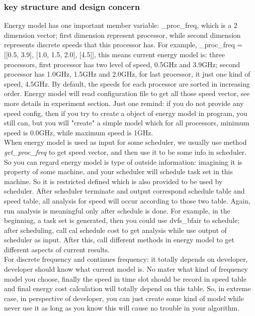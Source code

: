 \documentclass[11pt, oneside]{article}
\begin{document}
\subsubsection{key structure and design concern}
Energy model has one important member variable: \_proc\_freq, which is a 2 dimension vector; first dimension represent processor, while second dimension represents discrete speeds that this processor has. For example, \_proc\_freq = [[0.5, 3.9], [1.0, 1.5, 2.0], [4.5]], this means current energy model is: three processors, first processor has two level of speed, 0.5GHz and 3.9GHz; second processor has 1.0GHz, 1.5GHz and 2.0GHz, for last processor, it just one kind of speed, 4.5GHz. By default, the speeds for each processor are sorted in increasing order. Energy model will read configuration file to get all those speed vector, see more details in experiment section. Just one remind: if you do not provide any speed config, then if you try to create a object of energy model in program, you still can, but you will "create" a simple model which for all processors, minimum speed is 0.0GHz, while maximum speed is 1GHz.\\

When energy model is used as input for some scheduler, we usually use method \textit{get\_proc\_freq} to get speed vector, and then use it to be some info in scheduler. So you can regard energy model is type of outside information: imagining it is property of some machine, and  your scheduler will schedule task set in this machine. So it is restricted defined which is also provided to be used by scheduler. After scheduler terminate and output correspond schedule table and speed table, all analysis for speed will occur according to those two table. Again, run analysis is meaningful only after schedule is done. For example, in the beginning, a task set is generated, then you could use dvfs\_bfair to schedule; after scheduling, call cal schedule cost to get analysis while use output of scheduler as input. After this, call different methods in energy model to get different aspects of current results.\\

For discrete frequency and continues frequency: it totally depends on developer, developer should know what current model is. No mater what kind of frequency model you choose, finally the speed in time slot should be record in speed table and final energy cost calculation will totally depend on this table. So, in extreme case, in perspective of developer, you can just create some kind of model while never use it as long as you know this will cause no trouble in your algorithm.\\
\end{document}
